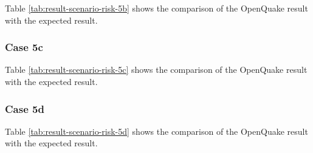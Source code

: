 

Table \ref{tab:result-scenario-risk-5b} shows the comparison of the OpenQuake result with the expected result.

\subsubsection{Case 5c}




Table \ref{tab:result-scenario-risk-5c} shows the comparison of the OpenQuake result with the expected result.

\subsubsection{Case 5d}




Table \ref{tab:result-scenario-risk-5d} shows the comparison of the OpenQuake result with the expected result.

